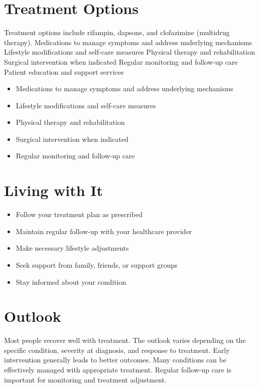 \section{Treatment Options}
Treatment options include rifampin, dapsone, and clofazimine (multidrug therapy). Medications to manage symptoms and address underlying mechanisms Lifestyle modifications and self-care measures Physical therapy and rehabilitation Surgical intervention when indicated Regular monitoring and follow-up care Patient education and support services

\begin{itemize}[noitemsep]
  \item Medications to manage symptoms and address underlying mechanisms
  \item Lifestyle modifications and self-care measures
  \item Physical therapy and rehabilitation
  \item Surgical intervention when indicated
  \item Regular monitoring and follow-up care
\end{itemize}
\section{Living with It}
\begin{itemize}[noitemsep]
  \item Follow your treatment plan as prescribed
  \item Maintain regular follow-up with your healthcare provider
  \item Make necessary lifestyle adjustments
  \item Seek support from family, friends, or support groups
  \item Stay informed about your condition
\end{itemize}
\section{Outlook}
Most people recover well with treatment. The outlook varies depending on the specific condition, severity at diagnosis, and response to treatment. Early intervention generally leads to better outcomes. Many conditions can be effectively managed with appropriate treatment. Regular follow-up care is important for monitoring and treatment adjustment.
